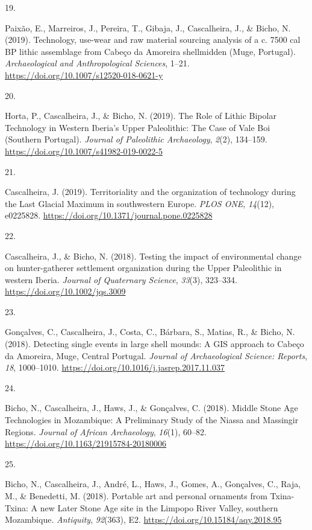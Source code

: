 \documentclass[11pt,a4paper,]{awesome-cv}
\newlength{\cslhangindent}
\newlength{\csllabelwidth}
\newenvironment{CSLReferences}[2] %
 {\begin{list}{}{%
  \setlength{\itemindent}{0pt}
  \setlength{\leftmargin}{0pt}
  \setlength{\parsep}{0pt}
  \ifodd #1
   \setlength{\leftmargin}{\cslhangindent}
   \setlength{\itemindent}{-1\cslhangindent}
  \fi
  \setlength{\itemsep}{#2\baselineskip}}}
 {\end{list}}
\newcommand{\CSLLeftMargin}[1]{\parbox[t]{\csllabelwidth}{\strut#1\strut}}
\newcommand{\CSLRightInline}[1]{\parbox[t]{\linewidth - \csllabelwidth}{\strut#1\strut}}
\begin{document}
\begin{CSLReferences}{0}{0}
\CSLLeftMargin{19. }%
\CSLRightInline{Paixão, E., Marreiros, J., Pereira, T., Gibaja, J.,
Cascalheira, J., \& Bicho, N. (2019). Technology, use-wear and raw
material sourcing analysis of a c. 7500 cal BP lithic assemblage from
Cabeço da Amoreira shellmidden (Muge, Portugal). \emph{Archaeological
and Anthropological Sciences}, 1--21.
\url{https://doi.org/10.1007/s12520-018-0621-y}}

\CSLLeftMargin{20. }%
\CSLRightInline{Horta, P., Cascalheira, J., \& Bicho, N. (2019). The
Role of Lithic Bipolar Technology in Western Iberia's Upper Paleolithic:
The Case of Vale Boi (Southern Portugal). \emph{Journal of Paleolithic
Archaeology}, \emph{2}(2), 134--159.
\url{https://doi.org/10.1007/s41982-019-0022-5}}

\CSLLeftMargin{21. }%
\CSLRightInline{Cascalheira, J. (2019). Territoriality and the
organization of technology during the Last Glacial Maximum in
southwestern Europe. \emph{PLOS ONE}, \emph{14}(12), e0225828.
\url{https://doi.org/10.1371/journal.pone.0225828}}

\CSLLeftMargin{22. }%
\CSLRightInline{Cascalheira, J., \& Bicho, N. (2018). Testing the impact
of environmental change on hunter-gatherer settlement organization
during the Upper Paleolithic in western Iberia. \emph{Journal of
Quaternary Science}, \emph{33}(3), 323--334.
\url{https://doi.org/10.1002/jqs.3009}}

\CSLLeftMargin{23. }%
\CSLRightInline{Gonçalves, C., Cascalheira, J., Costa, C., Bárbara, S.,
Matias, R., \& Bicho, N. (2018). Detecting single events in large shell
mounds: A GIS approach to Cabeço da Amoreira, Muge, Central Portugal.
\emph{Journal of Archaeological Science: Reports}, \emph{18},
1000--1010. \url{https://doi.org/10.1016/j.jasrep.2017.11.037}}

\CSLLeftMargin{24. }%
\CSLRightInline{Bicho, N., Cascalheira, J., Haws, J., \& Gonçalves, C.
(2018). Middle Stone Age Technologies in Mozambique: A Preliminary Study
of the Niassa and Massingir Regions. \emph{Journal of African
Archaeology}, \emph{16}(1), 60--82.
\url{https://doi.org/10.1163/21915784-20180006}}

\CSLLeftMargin{25. }%
\CSLRightInline{Bicho, N., Cascalheira, J., André, L., Haws, J., Gomes,
A., Gonçalves, C., Raja, M., \& Benedetti, M. (2018). Portable art and
personal ornaments from Txina-Txina: A new Later Stone Age site in the
Limpopo River Valley, southern Mozambique. \emph{Antiquity},
\emph{92}(363), E2. \url{https://doi.org/10.15184/aqy.2018.95}}


\end{CSLReferences}
\end{document}
